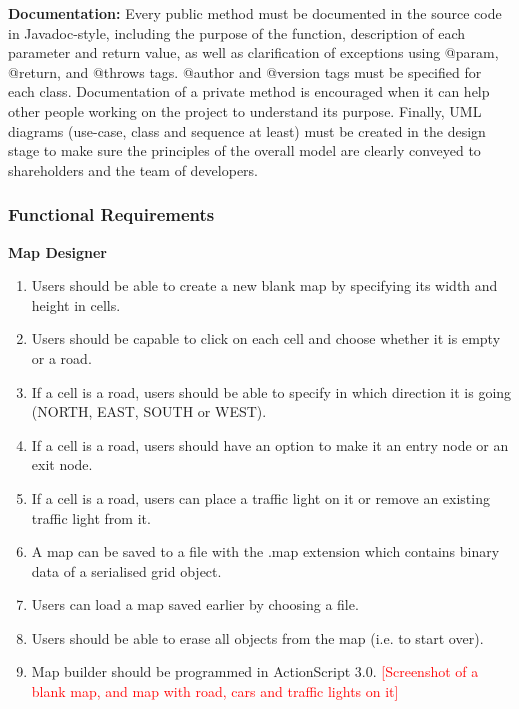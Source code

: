 \documentclass{article}
\begin{document}
	\noindent
	\textbf{Documentation:} Every public method must be documented in the source code in Javadoc-style, including the purpose of the function, description of each parameter and return value, as well as clarification of exceptions using @param, @return, and @throws tags. @author and @version tags must be specified for each class. 
	Documentation of a private method is encouraged when it can help other people working on the project to understand its purpose. 
	Finally, UML diagrams (use-case, class and sequence at least) must be created in the design stage to make sure the principles of the overall model are clearly conveyed to shareholders and the team of developers.  
	
	\subsubsection{Functional Requirements}
	{\bf Map Designer}
	\begin{enumerate}
		\item Users should be able to create a new blank map by specifying its width and height in cells. 
		\item Users should be capable to click on each cell and choose whether it is empty or a road.
		\item If a cell is a road, users should be able to specify in which direction it is going (NORTH, EAST, SOUTH or WEST).
		\item If a cell is a road, users should have an option to make it an entry node or an exit node.
		\item If a cell is a road, users can place a traffic light on it or remove an existing traffic light from it. 
		\item A map can be saved to a file with the .map extension which contains binary data of a serialised grid object.
		\item Users can load a map saved earlier by choosing a file.
		\item  Users should be able to erase all objects from the map (i.e. to start over). 
		\item Map builder should be programmed in ActionScript 3.0. 
		\textcolor{red}{[Screenshot of a blank map, and map with road, cars and traffic lights on it]}
	\end{enumerate}
	
\end{document}
